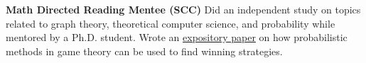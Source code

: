 \item \textbf{Math Directed Reading Mentee (SCC)} Did an independent study on topics related to graph theory, theoretical computer science, and probability while mentored by a Ph.D. student. Wrote an \href{https://drive.google.com/file/d/18_lJLjrylmR7WIwMwiC4YEWPSsCBr7fR/view?usp=sharing}{expository paper} on how probabilistic methods in game theory can be used to find winning strategies.